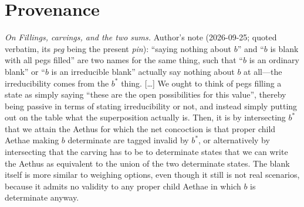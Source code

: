 \documentclass[11pt]{article}
\begin{document}


\section*{Provenance}

\noindent\textit{On Fillings, carvings, and the two sums.} Author's note (2026-09-25; quoted verbatim, its \emph{peg} being the present \emph{pin}): ``saying nothing about $b$'' and ``$b$ is blank with all pegs filled'' are two names for the same thing, such that ``$b$ is an ordinary blank'' or ``$b$ is an irreducible blank'' actually say nothing about $b$ at all---the irreducibility comes from the $b^{\ast}$ thing. [\ldots] We ought to think of pegs filling a state as simply saying ``these are the open possibilities for this value'', thereby being passive in terms of stating irreducibility or not, and instead simply putting out on the table what the superposition actually is. Then, it is by intersecting $b^{\ast}$ that we attain the Aethus for which the net concoction is that proper child Aethae making $b$ determinate are tagged invalid by $b^{\ast}$, or alternatively by intersecting that the carving has to be to determinate states that we can write the Aethus as equivalent to the union of the two determinate states. The blank itself is more similar to weighing options, even though it still is not real scenarios, because it admits no validity to any proper child Aethae in which $b$ is determinate anyway.

\printbibliography
\end{document}
